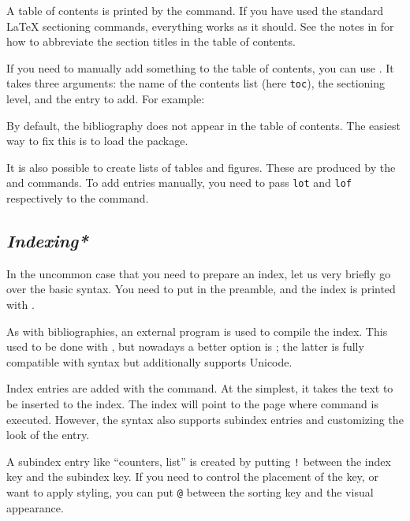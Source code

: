 A table of contents is printed by the  command.
If you have used the standard \LaTeX{} sectioning commands,
everything works as it should.
See the notes in 
for how to abbreviate the section titles in the table of contents.


If you need to manually add something to the table of contents,
you can use .
It takes three arguments:
the name of the contents list (here \verb|toc|), the sectioning level, and the entry to add.
For example:
\begin{ExampleCode}
\end{ExampleCode}

By default, the bibliography does not appear in the table of contents.
The easiest way to fix this is to load the  package.

It is also possible to create lists of tables and figures.
These are produced by the  and  commands.
To add entries manually, you need to pass \verb|lot| and \verb|lof|
respectively to the  command.


%
\subsection{\emph{Indexing*}}

In the uncommon case that you need to prepare an index,
let us very briefly go over the basic syntax.
You need to put  in the preamble,
and the index is printed with .

As with bibliographies, an external program is used to compile the index.
This used to be done with ,
but nowadays a better option is ;
the latter is fully compatible with  syntax
but additionally supports Unicode.

Index entries are added with the  command.
At the simplest, it takes the text to be inserted to the index.
The index will point to the page where command is executed.
However, the syntax also supports subindex entries
and customizing the look of the entry.

A subindex entry like ``counters, list''
is created by putting \verb|!| between the index key and the subindex key.
If you need to control the placement of the key,
or want to apply styling,
you can put \verb|@| between the sorting key and the visual appearance.

